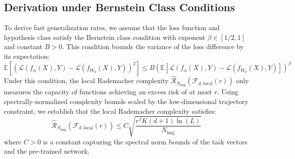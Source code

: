 \documentclass{article}
\theoremstyle{plain}
\theoremstyle{definition}
\theoremstyle{remark}
\begin{document}
\subsection{Derivation under Bernstein Class Conditions}
To derive fast generalization rates, we assume that the loss function and hypothesis class satisfy the Bernstein class condition with exponent $\beta \in [1/2, 1]$ and constant $B > 0$. This condition bounds the variance of the loss difference by its expectation:
\begin{equation}
\mathbb{E} \left[ \left( \mathcal{L}(f_{\alpha}(X), Y) - \mathcal{L}(f_{W_0}(X), Y) \right)^2 \right] \le B \left( \mathbb{E} \left[ \mathcal{L}(f_{\alpha}(X), Y) - \mathcal{L}(f_{W_0}(X), Y) \right] \right)^\beta
\end{equation}
Under this condition, the local Rademacher complexity $\widehat{\mathcal{R}}_{N_{\text{img}}}(\mathcal{F}_{d, \text{local}}(r))$ only measures the capacity of functions achieving an excess risk of at most $r$. Using spectrally-normalized complexity bounds scaled by the low-dimensional trajectory constraint, we establish that the local Rademacher complexity satisfies:
\begin{equation}
\widehat{\mathcal{R}}_{N_{\text{img}}}(\mathcal{F}_{d, \text{local}}(r)) \le C \sqrt{\frac{r^\beta K(d+1) \ln(L)}{N_{\text{img}}}}
\end{equation}
where $C > 0$ is a constant capturing the spectral norm bounds of the task vectors and the pre-trained network.
\end{document}
